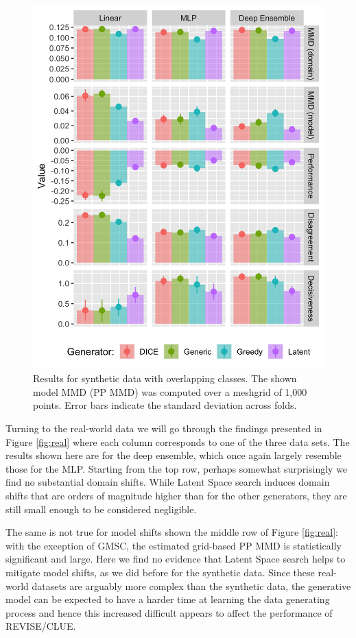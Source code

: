 \documentclass[conference,final,]{IEEEtran}
\begin{document}
\begin{figure}

{\centering \includegraphics[width=0.9\linewidth]{www/synthetic_results} 

}

\caption{Results for synthetic data with overlapping classes. The shown model MMD (PP MMD) was computed over a meshgrid of 1,000 points. Error bars indicate the standard deviation across folds.}\label{fig:syn}
\end{figure}

Turning to the real-world data we will go through the findings presented in Figure \ref{fig:real} where each column corresponds to one of the three data sets. The results shown here are for the deep ensemble, which once again largely resemble those for the MLP. Starting from the top row, perhaps somewhat surprisingly we find no substantial domain shifts. While Latent Space search induces domain shifts that are orders of magnitude higher than for the other generators, they are still small enough to be considered negligible.

The same is not true for model shifts shown the middle row of Figure \ref{fig:real}: with the exception of GMSC, the estimated grid-based PP MMD is statistically significant and large. Here we find no evidence that Latent Space search helps to mitigate model shifts, as we did before for the synthetic data. Since these real-world datasets are arguably more complex than the synthetic data, the generative model can be expected to have a harder time at learning the data generating process and hence this increased difficult appears to affect the performance of REVISE/CLUE.
\end{document}
